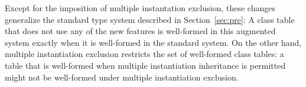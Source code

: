 \documentclass[10pt]{sigplanconf}
\renewcommand{\bar}{\overline}
\newcommand{\exc}{\mathrel{\lozenge}}
\newcommand{\excr}{\triangleright}
\newcommand{\excre}{\excr_\textrm{x}}
\newcommand{\excrc}{\excr_\textrm{c}}
\newcommand{\excro}{\excr_\textrm{o}}
\newcommand{\exce}{\exc_\textrm{x}}
\newcommand{\excc}{\exc_\textrm{c}}
\newcommand{\exco}{\exc_\textrm{o}}
\newcommand{\excp}{\exc_\textrm{m}}
\newcommand{\obb}[1]{\ensuremath{\llbracket \bar{#1} \rrbracket}}
\newcommand{\substb}[2]{\ensuremath{[\bar{#1}/\bar{#2}]}}
\newcommand{\Bottom}{\TYP{Bottom}}
\begin{document}
Except for the imposition of multiple instantation exclusion, 
these changes generalize the standard type system 
described in Section~\ref{sec:pre}: 
A class table that does not use any of the new features 
is well-formed in this augmented system 
exactly when it is well-formed in the standard system.
On the other hand, 
multiple instantiation exclusion
restricts the set of well-formed class tables: 
a table that is well-formed when multiple instantiation inheritance is permitted
might not be well-formed under multiple instantiation exclusion.




  


\end{document}
